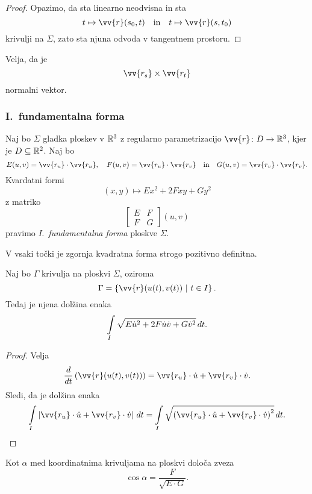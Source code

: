 \begin{proof}
Opazimo, da sta linearno neodvisna in sta
\[
t \mapsto \vv{r}(s_0,t)
\quad \text{in} \quad
t \mapsto \vv{r}(s,t_0)
\]
krivulji na $\Sigma$, zato sta njuna odvoda v tangentnem prostoru.
\end{proof}

\begin{opomba}
Velja, da je
\[
\vv{r_s} \times \vv{r_t}
\]
normalni vektor.
\end{opomba}

\subsubsection{I.~fundamentalna forma}

\begin{definicija}
Naj bo $\Sigma$ gladka ploskev v $\mathbb{R}^3$ z regularno parametrizacijo
$\vv{r} \colon D \to \R^3$, kjer je $D \subseteq \mathbb{R}^2$. Naj bo
\[
E(u,v) = \vv{r_u} \cdot \vv{r_u},
\quad
F(u,v) = \vv{r_u} \cdot \vv{r_v}
\quad \text{in} \quad
G(u,v) = \vv{r_v} \cdot \vv{r_v}.
\]
Kvardatni formi
\[
(x,y) \mapsto Ex^2 + 2Fxy + Gy^2
\]
z matriko
\[
\begin{bmatrix}
E & F \\
F & G
\end{bmatrix}
(u,v)
\]
pravimo
\emph{I.~fundamentalna forma}
ploskve $\Sigma$.
\end{definicija}

\begin{opomba}
V vsaki točki je zgornja kvadratna forma strogo pozitivno
definitna.
\end{opomba}

\begin{trditev}
Naj bo $\Gamma$ krivulja na ploskvi $\Sigma$, oziroma
\[
\Gamma = \setb{\vv{r}(u(t), v(t))}{t \in I}.
\]
Tedaj je njena dolžina enaka
\[
\int\limits_I \sqrt{E \dot{u}^2 + 2F \dot{u} \dot{v} + G \dot{v}^2}\,dt.
\]
\end{trditev}

\begin{proof}
Velja
\[
\frac{d}{dt}\left(\vv{r}(u(t), v(t))\right) =
\vv{r_u} \cdot \dot{u} + \vv{r_v} \cdot \dot{v}.
\]
Sledi, da je dolžina enaka
\[
\lint_I \abs{\vv{r_u} \cdot \dot{u} + \vv{r_v} \cdot \dot{v}}\,dt =
\lint_I \sqrt{
\left(\vv{r_u} \cdot \dot{u} + \vv{r_v} \cdot \dot{v}\right)^2
}\,dt. \qedhere
\]
\end{proof}

\begin{trditev}
Kot $\alpha$ med koordinatnima krivuljama na ploskvi določa zveza
\[
\cos \alpha = \frac{F}{\sqrt{E \cdot G}}.
\]
\end{trditev}

